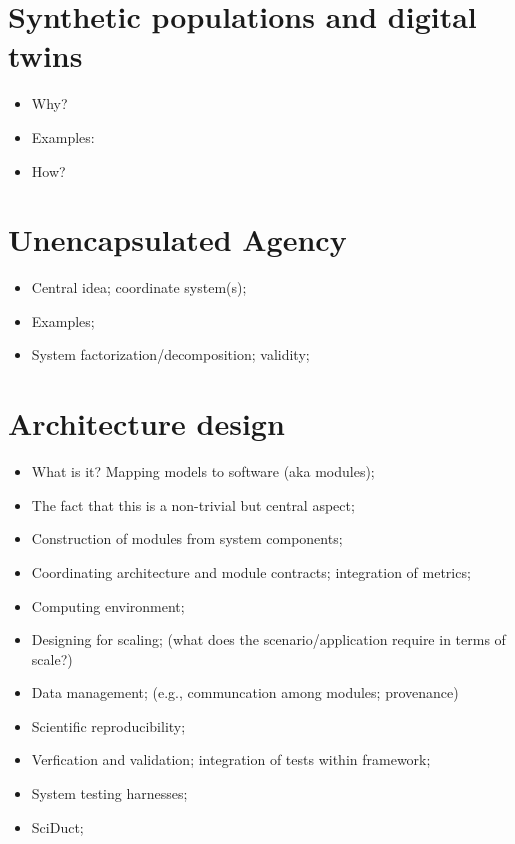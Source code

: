 \documentclass[12pt]{book}
\begin{document}
\section{Synthetic populations and digital twins}

\begin{itemize}
\item Why?
\item Examples:
\item How?
\end{itemize}

\section{Unencapsulated Agency}

\begin{itemize}
\item Central idea; coordinate system(s);
\item Examples;
\item System factorization/decomposition; validity;
\end{itemize}

\section{Architecture design}


\begin{itemize}
\item What is it? Mapping models to software (aka modules);
\item The fact that this is a non-trivial but central aspect;
\item Construction of modules from system components;
\item Coordinating architecture and module contracts; integration of metrics;
\item Computing environment;
\item Designing for scaling; (what does the scenario/application
  require in terms of scale?)
\item Data management; (e.g., communcation among modules; provenance)
\item Scientific reproducibility;
\item Verfication and validation; integration of tests within framework;
\item System testing harnesses;
\item SciDuct;
\end{itemize}
\end{document}
